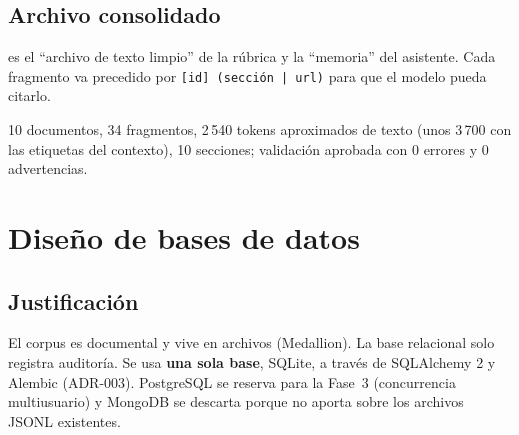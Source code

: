 \section{Archivo consolidado}
 es el ``archivo de texto limpio'' de la rúbrica y la ``memoria'' del
asistente. Cada fragmento va precedido por \texttt{[id] (sección | url)} para que el modelo pueda citarlo.

\begin{evidencia}
10 documentos, 34 fragmentos, 2\,540 tokens aproximados de texto (unos 3\,700 con las etiquetas del contexto),
10 secciones; validación aprobada con 0 errores y 0 advertencias.
\end{evidencia}

\chapter{Diseño de bases de datos}\label{cap:bd}

\section{Justificación}
El corpus es documental y vive en archivos (Medallion). La base relacional solo registra auditoría. Se usa
\textbf{una sola base}, SQLite, a través de SQLAlchemy 2 y Alembic (ADR-003). PostgreSQL se reserva para la
Fase~3 (concurrencia multiusuario) y MongoDB se descarta porque no aporta sobre los archivos JSONL existentes.

